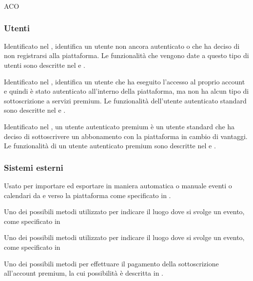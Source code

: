 \begin{listaPersonale}{ACO}
    \subsubsection*{Utenti}
    Identificato nel , identifica un utente non ancora autenticato o che ha deciso di non registrarsi alla piattaforma. Le funzionalità che vengono date a questo tipo di utenti sono descritte nel  e .

    Identificato nel , identifica un utente che ha eseguito l'accesso al proprio account e quindi è stato autenticato all'interno della piattaforma, ma non ha alcun tipo di sottoscrizione a servizi premium. Le funzionalità dell'utente autenticato standard sono descritte nel  e .

    Identificato nel , un utente autenticato premium è un utente standard che ha deciso di sottoscrivere un abbonamento con la piattaforma in cambio di vantaggi. Le funzionalità di un utente autenticato premium sono descritte nel  e .

    \subsubsection*{Sistemi esterni}
    Usato per importare ed esportare in maniera automatica o manuale eventi o calendari da e verso la piattaforma come specificato in .

    Uno dei possibili metodi utilizzato per indicare il luogo dove si svolge un evento, come specificato in 


    Uno dei possibili metodi utilizzato per indicare il luogo dove si svolge un evento, come specificato in 

    Uno dei possibili metodi per effettuare il pagamento della sottoscrizione all'account premium, la cui possibilità è descritta in .


\end{listaPersonale}
